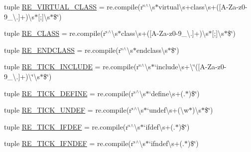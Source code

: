 \begin{DoxyCompactItemize}
\item 
tuple \hyperlink{namespacesrc_1_1regex_afd7f18f1e9420146db3abfbc7716c3b8}{R\-E\-\_\-\-V\-I\-R\-T\-U\-A\-L\-\_\-\-C\-L\-A\-S\-S} = re.\-compile(r\char`\"{}$^\wedge$\textbackslash{}s$\ast$virtual\textbackslash{}s+class\textbackslash{}s+(\mbox{[}A-\/Za-\/z0-\/9\-\_\-\textbackslash{}.\mbox{]}+)\textbackslash{}s$\ast$\mbox{[};\mbox{]}\textbackslash{}s$\ast$\$\char`\"{})
\item 
tuple \hyperlink{namespacesrc_1_1regex_ae722982be3810457beb6591f1ad8786b}{R\-E\-\_\-\-C\-L\-A\-S\-S} = re.\-compile(r\char`\"{}$^\wedge$\textbackslash{}s$\ast$class\textbackslash{}s+(\mbox{[}A-\/Za-\/z0-\/9\-\_\-\textbackslash{}.\mbox{]}+)\textbackslash{}s$\ast$\mbox{[};\mbox{]}\textbackslash{}s$\ast$\$\char`\"{})
\item 
tuple \hyperlink{namespacesrc_1_1regex_a76f5288ee51a094469709268ab9a56f0}{R\-E\-\_\-\-E\-N\-D\-C\-L\-A\-S\-S} = re.\-compile(r\char`\"{}$^\wedge$\textbackslash{}s$\ast$endclass\textbackslash{}s$\ast$\$\char`\"{})
\item 
tuple \hyperlink{namespacesrc_1_1regex_ae69a7c456a3589208559f5347d7221ad}{R\-E\-\_\-\-T\-I\-C\-K\-\_\-\-I\-N\-C\-L\-U\-D\-E} = re.\-compile(r\char`\"{}$^\wedge$\textbackslash{}s$\ast$`include\textbackslash{}s+\textbackslash{}\char`\"{}(\mbox{[}A-\/Za-\/z0-\/9\-\_\-\textbackslash{}.\mbox{]}+)\textbackslash{}\char`\"{}\textbackslash{}s$\ast$\$\char`\"{})
\item 
tuple \hyperlink{namespacesrc_1_1regex_a082b6e2cd74e499fd9dfc349fd137285}{R\-E\-\_\-\-T\-I\-C\-K\-\_\-\-D\-E\-F\-I\-N\-E} = re.\-compile(r\char`\"{}$^\wedge$\textbackslash{}s$\ast$`define\textbackslash{}s+(.$\ast$)\$\char`\"{})
\item 
tuple \hyperlink{namespacesrc_1_1regex_aec14c5cdf0e22540fed3923a358dc928}{R\-E\-\_\-\-T\-I\-C\-K\-\_\-\-U\-N\-D\-E\-F} = re.\-compile(r\char`\"{}$^\wedge$\textbackslash{}s$\ast$`undef\textbackslash{}s+(\textbackslash{}w$\ast$)\textbackslash{}s$\ast$\$\char`\"{})
\item 
tuple \hyperlink{namespacesrc_1_1regex_ade2998c2e2b41720cd6cdf9776cd28de}{R\-E\-\_\-\-T\-I\-C\-K\-\_\-\-I\-F\-D\-E\-F} = re.\-compile(r\char`\"{}$^\wedge$\textbackslash{}s$\ast$`ifdef\textbackslash{}s+(.$\ast$)\$\char`\"{})
\item 
tuple \hyperlink{namespacesrc_1_1regex_ac8f063a17b1525cb2e13b5e5ebdabee2}{R\-E\-\_\-\-T\-I\-C\-K\-\_\-\-I\-F\-N\-D\-E\-F} = re.\-compile(r\char`\"{}$^\wedge$\textbackslash{}s$\ast$`ifndef\textbackslash{}s+(.$\ast$)\$\char`\"{})
\item 

\end{DoxyCompactItemize}
